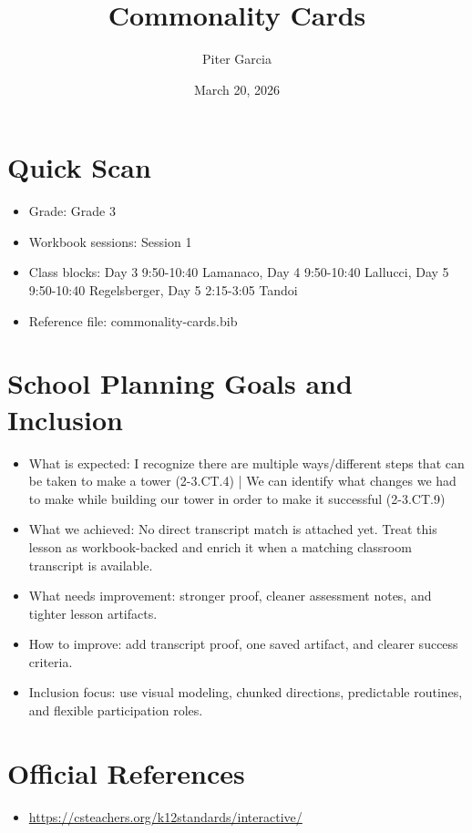 \documentclass[11pt]{article}
\title{Commonality Cards}
\author{Piter Garcia}
\date{March 20, 2026}
\begin{document}
\maketitle
\section*{Quick Scan}
\begin{itemize}[leftmargin=*]
\item Grade: Grade 3
\item Workbook sessions: Session 1
\item Class blocks: Day 3 9:50-10:40 Lamanaco, Day 4 9:50-10:40 Lallucci, Day 5 9:50-10:40 Regelsberger, Day 5 2:15-3:05 Tandoi
\item Reference file: commonality-cards.bib
\end{itemize}
\section*{School Planning Goals and Inclusion}
\begin{itemize}[leftmargin=*]
\item What is expected: I recognize there are multiple ways/different steps that can be taken to make a tower (2-3.CT.4) | We can identify what changes we had to make while building our tower in order to make it successful (2-3.CT.9)
\item What we achieved: No direct transcript match is attached yet. Treat this lesson as workbook-backed and enrich it when a matching classroom transcript is available.
\item What needs improvement: stronger proof, cleaner assessment notes, and tighter lesson artifacts.
\item How to improve: add transcript proof, one saved artifact, and clearer success criteria.
\item Inclusion focus: use visual modeling, chunked directions, predictable routines, and flexible participation roles.
\end{itemize}
\section*{Official References}
\begin{itemize}[leftmargin=*]
\item \url{https://csteachers.org/k12standards/interactive/}

\end{itemize}
\end{document}
